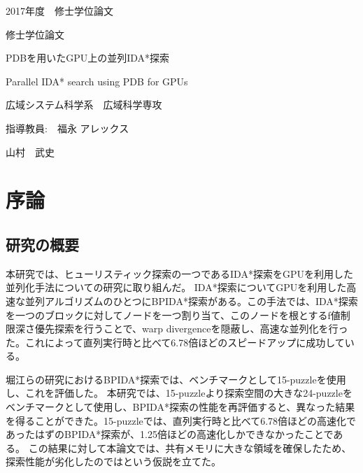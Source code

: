 \documentclass[a4paper,11pt,oneside,openany]{jsbook}
\begin{document}
\thispagestyle{empty}
2017年度　修士学位論文%
\bigskip%
\LARGE%
\begin{center}
修士学位論文
\end{center}
\bigskip\bigskip\bigskip\bigskip\bigskip\bigskip\bigskip %
\begin{center} %
PDBを用いたGPU上の並列IDA*探索
\end{center}
\large %
\begin{center}
Parallel IDA* search using PDB for GPUs 
\end{center}
\bigskip\bigskip\bigskip\bigskip\bigskip\bigskip\bigskip\bigskip\bigskip\bigskip
\bigskip\bigskip\bigskip\bigskip\bigskip\bigskip\bigskip\bigskip\bigskip
\Large %
\begin{center}
広域システム科学系　広域科学専攻
\end{center}
\Large %
\begin{center}
指導教員:　福永 アレックス
\end{center}
\LARGE %
\begin{center}
山村　武史
\end{center}
\normalsize
\thispagestyle{empty}
\setcounter{tocdepth}{3}
\tableofcontents

\chapter{序論}
\section{研究の概要}
本研究では、ヒューリスティック探索の一つであるIDA*探索\cite{Kor85}をGPUを利用した並列化手法についての研究に取り組んだ。
IDA*探索についてGPUを利用した高速な並列アルゴリズムのひとつにBPIDA*探索\cite{HA17}がある。この手法では、IDA*探索を一つのブロックに対してノードを一つ割り当て、このノードを根とするf値制限深さ優先探索を行うことで、warp divergenceを隠蔽し、高速な並列化を行った。これによって直列実行時と比べて6.78倍ほどのスピードアップに成功している。

堀江らの研究\cite{HA17}におけるBPIDA*探索では、ベンチマークとして15-puzzleを使用し、これを評価した。
本研究では、15-puzzleより探索空間の大きな24-puzzleをベンチマークとして使用し、BPIDA*探索の性能を再評価すると、異なった結果を得ることができた。15-puzzleでは、直列実行時と比べて6.78倍ほどの高速化であったはずのBPIDA*探索が、1.25倍ほどの高速化しかできなかったことである。
この結果に対して本論文では、共有メモリに大きな領域を確保したため、探索性能が劣化したのではという仮説を立てた。
\end{document}
